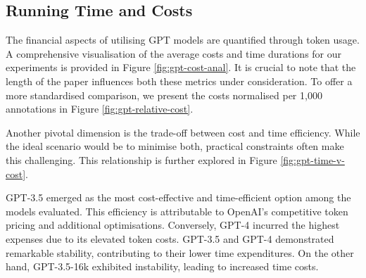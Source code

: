 \subsection{Running Time and Costs}

The financial aspects of utilising GPT models are quantified through token usage. A comprehensive visualisation of the average costs and time durations for our experiments is provided in Figure \ref{fig:gpt-cost-anal}. It is crucial to note that the length of the paper influences both these metrics under consideration. To offer a more standardised comparison, we present the costs normalised per 1,000 annotations in Figure \ref{fig:gpt-relative-cost}.

Another pivotal dimension is the trade-off between cost and time efficiency. While the ideal scenario would be to minimise both, practical constraints often make this challenging. This relationship is further explored in Figure \ref{fig:gpt-time-v-cost}.

GPT-3.5 emerged as the most cost-effective and time-efficient option among the models evaluated. This efficiency is attributable to OpenAI's competitive token pricing and additional optimisations. Conversely, GPT-4 incurred the highest expenses due to its elevated token costs. GPT-3.5 and GPT-4 demonstrated remarkable stability, contributing to their lower time expenditures. On the other hand, GPT-3.5-16k exhibited instability, leading to increased time costs.

